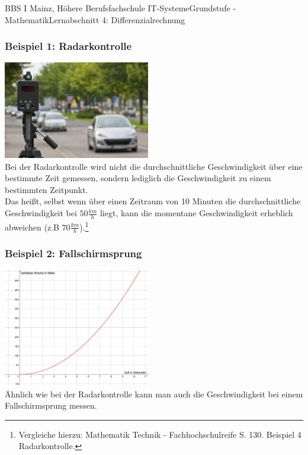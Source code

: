 \documentclass[11pt,twocolumn,oneside,openany,headings=optiontotoc,11pt,numbers=noenddot,final]{article}
\begin{document}
\begin{worksheet}{BBS I Mainz, Höhere Berufsfachschule IT-Systeme}{Grundstufe - Mathematik}{Lernabschnitt 4: Differenzialrechnung}
		\subsubsection*{Beispiel 1: Radarkontrolle}
		\includegraphics[width=0.48\textwidth]{../99_Bilder/04_Skr_momAen.jpg}\\
		Bei der Radarkontrolle wird nicht die durchschnittliche Geschwindigkeit über eine bestimmte Zeit gemessen, sondern lediglich die Geschwindigkeit zu einem bestimmten Zeitpunkt.\\
		Das heißt, selbst wenn über einen Zeitraum von 10 Minuten die durchschnittliche Geschwindigkeit bei \(50 \frac{km}{h}\) liegt, kann die momentane Geschwindigkeit erheblich abweichen (z.B \(70 \frac{km}{h}\)).\footnote{Vergleiche hierzu: Mathematik Technik - Fachhochschulreife S. 130. Beispiel 4 Radarkontrolle.}
		\subsubsection*{Beispiel 2: Fallschirmsprung}
		\includegraphics[width=0.48\textwidth]{../99_Bilder/04_Skr_FallS.jpg}\\
		Ähnlich wie bei der Radarkontrolle kann man auch die Geschwindigkeit bei einem Fallschirmsprung messen.

\end{worksheet}
\end{document}
